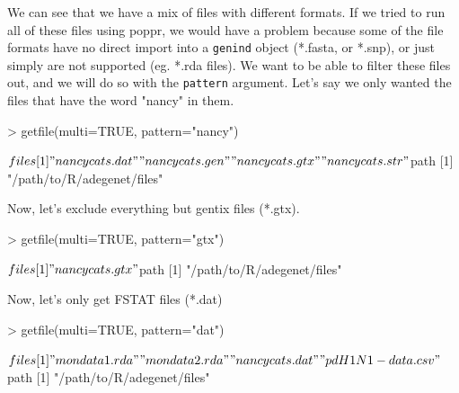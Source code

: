\documentclass[letterpaper]{article}
\begin{document}
We can see that we have a mix of files with different formats. If we tried to run all of these files using poppr, we would have a problem because some of the file formats have no direct import into a \texttt{genind} object (*.fasta, or *.snp), or just simply are not supported (eg. *.rda files). We want to be able to filter these files out, and we will do so with the \texttt{pattern} argument. Let's say we only wanted the files that have the word "nancy" in them.
\begin{Schunk}
\begin{Sinput}
> getfile(multi=TRUE, pattern="nancy")
\end{Sinput}
\end{Schunk}
\begin{Schunk}
\begin{Soutput}
$files
[1] "nancycats.dat" "nancycats.gen" "nancycats.gtx" "nancycats.str"

$path
[1] "/path/to/R/adegenet/files"
\end{Soutput}
\end{Schunk}
Now, let's exclude everything but gentix files (*.gtx).
\begin{Schunk}
\begin{Sinput}
> getfile(multi=TRUE, pattern="gtx")
\end{Sinput}
\end{Schunk}
\begin{Schunk}
\begin{Soutput}
$files
[1] "nancycats.gtx"

$path
[1] "/path/to/R/adegenet/files"
\end{Soutput}
\end{Schunk}
Now, let's only get FSTAT files (*.dat)
\begin{Schunk}
\begin{Sinput}
> getfile(multi=TRUE, pattern="dat")
\end{Sinput}
\end{Schunk}
\begin{Schunk}
\begin{Soutput}
$files
[1] "mondata1.rda"    "mondata2.rda"    "nancycats.dat"   "pdH1N1-data.csv"

$path
[1] "/path/to/R/adegenet/files"
\end{Soutput}
\end{Schunk}
\end{document}
